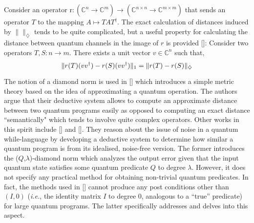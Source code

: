 Consider an operator  $ \text{r} : (\mathbb{C}^{n} \xrightarrow[]{} \mathbb{C}^{m}) \xrightarrow[]{} (\mathbb{C}^{n\times n}\xrightarrow[]{} \mathbb{C}^{m\times m})$ that sends an operator $T$ to the mapping $A \mapsto TAT^{\dag}$. The exact calculation of distances induced by $\lVert \rVert_{\diamondsuit}$ tends to be quite complicated, but a useful property for calculating the distance between quantum channels in the image of $r$ is provided [\cite{watrous2018theory}]:
Consider two operators $T, S : n \xrightarrow{} m$. There exists a unit vector $v \in \mathbb{C}^{n}$ such that, 
\begin{equation} \label{eq:norm_iso_r}
\begin{centering}
\lVert r(T) (vv^{\dag})-r(S) (vv^{\dag}) \rVert_{1} = \lVert r(T)-r(S) \rVert_{\diamondsuit}
 \end{centering}
\end{equation}


The notion of a diamond norm is used in [\cite{dahlqvist2022syntactic}] which introduces a simple metric theory based on the idea of approximating a quantum operation. The authors argue that their deductive system allows to compute an approximate distance between two quantum programs easily as opposed to computing an exact distance ``semantically" which tends to involve quite complex operators. 
Other works in this spirit include [\cite{hung2019quantitative}] and [\cite{tao2021gleipnir}]. They reason about the issue of noise in a quantum while-language by developing a deductive system to determine how similar a quantum program is from its idealised, noise-free version. The former introduces the ($Q$,$\lambda$)-diamond norm which analyzes the output error given that the input quantum state satisfies some quantum predicate $Q$ to degree $\lambda$. However, it does not specify any practical method for obtaining non-trivial quantum predicates. In fact, the methods used in [\cite{hung2019quantitative}] cannot produce any post conditions other than $(I,0)$ (\textit{i.e.}, the identity matrix $I$ to degree 0, analogous to a ``true” predicate) for large quantum programs. The latter specifically addresses and delves into this aspect. 

\vspace{-7pt}

